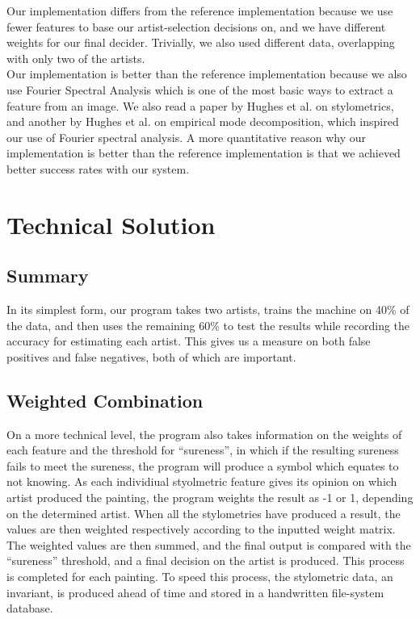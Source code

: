 \documentclass[twocolumn]{article}
\begin{document}
  Our implementation differs from the reference implementation because we use
  fewer features to base our artist-selection decisions on, and we have
  different weights for our final decider. Trivially, we also used different
  data, overlapping with only two of the artists. \\
  
  Our implementation is better than the reference implementation because we also
  use Fourier Spectral Analysis which is one of the most basic ways to extract a
  feature from an image. We also read a paper by Hughes et al. on stylometrics,
  and another by Hughes et al. on empirical mode decomposition, which inspired
  our use of Fourier spectral analysis. A more quantitative reason why our
  implementation is better than the reference implementation is that we achieved
  better success rates with our system.

  \section{Technical Solution}
  \subsection{Summary}
  In its simplest form, our program takes two artists, trains the machine on
  40\% of the data, and then uses the remaining 60\% to test the results while
  recording the accuracy for estimating each artist. This gives us a measure on
  both false positives and false negatives, both of which are important.

  \subsection{Weighted Combination}
  On a more technical level, the program also takes information on the weights
  of each feature and the threshold for ``sureness'', in which if the resulting
  sureness fails to meet the sureness, the program will produce a symbol which
  equates to not knowing. As each individiual styolmetric feature gives its
  opinion on which artist produced the painting, the program weights the result
  as -1 or 1, depending on the determined artist. When all the stylometries have
  produced a result, the values are then weighted respectively according to the
  inputted weight matrix. The weighted values are then summed, and the final
  output is compared with the ``sureness'' threshold, and a final decision on
  the artist is produced. This process is completed for each painting. To speed
  this process, the stylometric data, an invariant, is produced ahead of time
  and stored in a handwritten file-system database. \\
\end{document}
